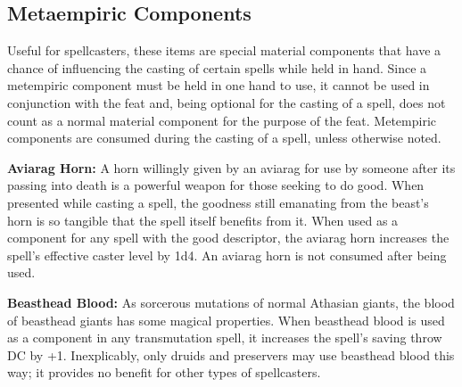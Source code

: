 \subsection{Metaempiric Components}
Useful for spellcasters, these items are special material components that have a chance of influencing the casting of certain spells while held in hand. Since a metempiric component must be held in one hand to use, it cannot be used in conjunction with the  feat and, being optional for the casting of a spell, does not count as a normal material component for the purpose of the  feat. Metempiric components are consumed during the casting of a spell, unless otherwise noted.


\textbf{Aviarag Horn:} A horn willingly given by an aviarag for use by someone after its passing into death is a powerful weapon for those seeking to do good. When presented while casting a spell, the goodness still emanating from the beast's horn is so tangible that the spell itself benefits from it. When used as a component for any spell with the good descriptor, the aviarag horn increases the spell's effective caster level by 1d4. An aviarag horn is not consumed after being used.

\textbf{Beasthead Blood:} As sorcerous mutations of normal Athasian giants, the blood of beasthead giants has some magical properties. When beasthead blood is used as a component in any transmutation spell, it increases the spell's saving throw DC by +1. Inexplicably, only druids and preservers may use beasthead blood this way; it provides no benefit for other types of spellcasters.

